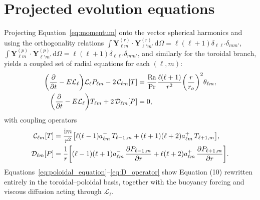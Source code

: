 \documentclass[11pt]{article}
\numberwithin{equation}{section}
\begin{document}
\section{Projected evolution equations}
Projecting Equation~\eqref{eq:momentum} onto the vector spherical harmonics and using the orthogonality relations
$\int \bm{Y}_{\ell m}^{(r)} \cdot \bm{Y}_{\ell' m'}^{(r)} \, \mathrm{d}\Omega = \ell(\ell+1) \delta_{\ell\ell'} \delta_{mm'}$,
$\int \bm{Y}_{\ell m}^{(p)} \cdot \bm{Y}_{\ell' m'}^{(p)} \, \mathrm{d}\Omega = \ell(\ell+1) \delta_{\ell\ell'} \delta_{mm'}$, and similarly for the toroidal branch, yields a coupled set of radial equations for each $(\ell,m)$:
\begin{align}
  \qty(\pdv{}{t} - E \mathcal{L}_\ell) \mathcal{L}_\ell P_{\ell m}
  - 2\, \mathcal{C}_{\ell m}[T]
  &= \frac{\mathrm{Ra}}{\mathrm{Pr}} \frac{\ell(\ell+1)}{r^2} \qty(\frac{r}{r_o})^2 \theta_{\ell m},
  \label{eq:poloidal_equation} \\
  \qty(\pdv{}{t} - E \mathcal{L}_\ell) T_{\ell m}
  + 2\, \mathcal{D}_{\ell m}[P]
  &= 0,
  \label{eq:toroidal_equation}
\end{align}
with coupling operators
\begin{align}
  \mathcal{C}_{\ell m}[T] &=
    \frac{\mathrm{i} m}{r^2} \qty[
       \ell(\ell-1) a_{\ell m}^{-}\, T_{\ell-1,m}
       + (\ell+1)(\ell+2) a_{\ell m}^{+}\, T_{\ell+1,m}
    ],
  \label{eq:C_operator} \\
  \mathcal{D}_{\ell m}[P] &=
    \frac{1}{r}
    \qty[
       (\ell-1)(\ell+1) a_{\ell m}^{-}\, \pdv{P_{\ell-1,m}}{r}
       + \ell(\ell+2) a_{\ell m}^{+}\, \pdv{P_{\ell+1,m}}{r}
    ].
  \label{eq:D_operator}
\end{align}
Equations~\eqref{eq:poloidal_equation}--\eqref{eq:D_operator} show Equation (10) rewritten entirely in the toroidal--poloidal basis, together with the buoyancy forcing and viscous diffusion acting through $\mathcal{L}_\ell$.
\end{document}
